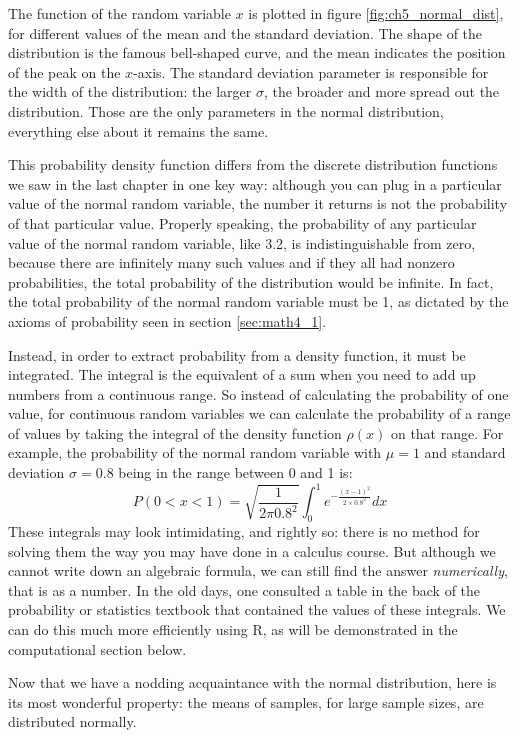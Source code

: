 \documentclass[
]{book}
\theoremstyle{definition}
\theoremstyle{definition}
\theoremstyle{definition}
\theoremstyle{remark}
\begin{document}
The function of the random variable \(x\) is plotted in figure \ref{fig:ch5_normal_dist}, for different values of the mean and the standard deviation. The shape of the distribution is the famous bell-shaped curve, and the mean indicates the position of the peak on the \(x\)-axis. The standard deviation parameter is responsible for the width of the distribution: the larger \(\sigma\), the broader and more spread out the distribution. Those are the only parameters in the normal distribution, everything else about it remains the same.

This probability density function differs from the discrete distribution functions we saw in the last chapter in one key way: although you can plug in a particular value of the normal random variable, the number it returns is not the probability of that particular value. Properly speaking, the probability of any particular value of the normal random variable, like 3.2, is indistinguishable from zero, because there are infinitely many such values and if they all had nonzero probabilities, the total probability of the distribution would be infinite. In fact, the total probability of the normal random variable must be 1, as dictated by the axioms of probability seen in section \ref{sec:math4_1}.

Instead, in order to extract probability from a density function, it must be integrated. The integral is the equivalent of a sum when you need to add up numbers from a continuous range. So instead of calculating the probability of one value, for continuous random variables we can calculate the probability of a range of values by taking the integral of the density function \(\rho(x)\) on that range. For example, the probability of the normal random variable with \(\mu=1\) and standard deviation \(\sigma=0.8\) being in the range between 0 and 1 is:
\[ P(0 < x < 1) = \sqrt{\frac{1}{2\pi 0.8^2}} \int_{0} ^1 e^{-\frac{(x-1)^2}{2 \times 0.8^2}}dx\]
These integrals may look intimidating, and rightly so: there is no method for solving them the way you may have done in a calculus course. But although we cannot write down an algebraic formula, we can still find the answer \emph{numerically}, that is as a number. In the old days, one consulted a table in the back of the probability or statistics textbook that contained the values of these integrals. We can do this much more efficiently using R, as will be demonstrated in the computational section below.

Now that we have a nodding acquaintance with the normal distribution, here is its most wonderful property: the means of samples, for large sample sizes, are distributed normally.
\end{document}
